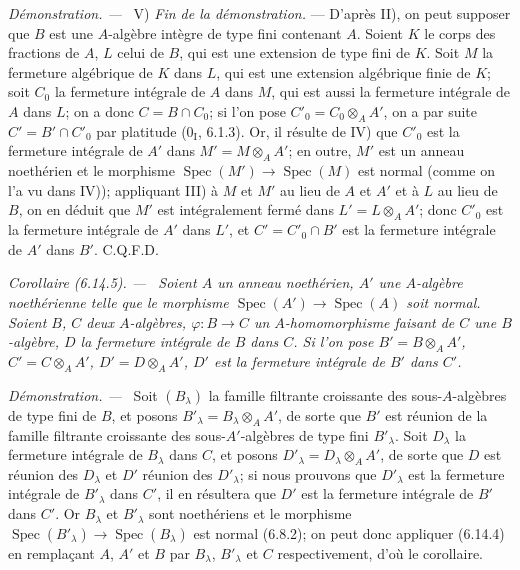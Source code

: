 \documentclass[10pt,oneside]{book}
\newcommand{\oldpage}[2][]{%
  \setcounter{footnote}{0}%
  \marginpar{\scriptsize\textbf{#1}~|~#2}\ignorespaces}
\newenvironment{corollary}[1][]{%
  \par\medskip\noindent\itshape Corollaire (#1). ---\ }{\par}
\newenvironment{proof}{%
  \par\medskip\noindent\textit{Démonstration. ---\ }}{\par}
\begin{document}
\begin{proof}
\oldpage[IV-2]{176}
V) \emph{Fin de la démonstration.} --- D'après II), on peut supposer que
$B$ est une $A$-algèbre intègre de type fini contenant $A$. Soient $K$ le
corps des fractions de $A$, $L$ celui de $B$, qui est une extension de type
fini de $K$. Soit $M$ la fermeture algébrique de $K$ dans $L$, qui est une
extension algébrique finie de $K$; soit $C_0$ la fermeture intégrale de $A$
dans $M$, qui est aussi la fermeture intégrale de $A$ dans $L$; on a donc
$C=B\cap C_0$; si l'on pose $C'_0=C_0\otimes_A A'$, on a par suite
$C'=B'\cap C'_0$ par platitude (0$_{\mathrm I}$, 6.1.3). Or, il résulte de
IV) que $C'_0$ est la fermeture intégrale de $A'$ dans
$M'=M\otimes_A A'$; en outre, $M'$ est un anneau noethérien et le morphisme
$\operatorname{Spec}(M')\to\operatorname{Spec}(M)$ est normal (comme on
l'a vu dans IV)); appliquant III) à $M$ et $M'$ au lieu de $A$ et $A'$ et
à $L$ au lieu de $B$, on en déduit que $M'$ est intégralement fermé dans
$L'=L\otimes_A A'$; donc $C'_0$ est la fermeture intégrale de $A'$ dans
$L'$, et $C'=C'_0\cap B'$ est la fermeture intégrale de $A'$ dans $B'$.
C.Q.F.D.
\end{proof}

\begin{corollary}[6.14.5]
\label{IV.2.s6.14.5-fr}
Soient $A$ un anneau noethérien, $A'$ une $A$-algèbre noethérienne telle
que le morphisme $\operatorname{Spec}(A')\to\operatorname{Spec}(A)$ soit
normal. Soient $B$, $C$ deux $A$-algèbres,
$\varphi:B\to C$ un $A$-homomorphisme faisant de $C$ une $B$-algèbre, $D$
la fermeture intégrale de $B$ dans $C$. Si l'on pose
$B'=B\otimes_A A'$, $C'=C\otimes_A A'$, $D'=D\otimes_A A'$, $D'$ est la
fermeture intégrale de $B'$ dans $C'$.
\end{corollary}

\begin{proof}
Soit $(B_\lambda)$ la famille filtrante croissante des sous-$A$-algèbres
de type fini de $B$, et posons $B'_\lambda=B_\lambda\otimes_A A'$, de
sorte que $B'$ est réunion de la famille filtrante croissante des
sous-$A'$-algèbres de type fini $B'_\lambda$. Soit $D_\lambda$ la
fermeture intégrale de $B_\lambda$ dans $C$, et posons
$D'_\lambda=D_\lambda\otimes_A A'$, de sorte que $D$ est réunion des
$D_\lambda$ et $D'$ réunion des $D'_\lambda$; si nous prouvons que
$D'_\lambda$ est la fermeture intégrale de $B'_\lambda$ dans $C'$, il en
résultera que $D'$ est la fermeture intégrale de $B'$ dans $C'$. Or
$B_\lambda$ et $B'_\lambda$ sont noethériens et le morphisme
$\operatorname{Spec}(B'_\lambda)\to\operatorname{Spec}(B_\lambda)$ est
normal (6.8.2); on peut donc appliquer (6.14.4) en remplaçant $A$, $A'$ et
$B$ par $B_\lambda$, $B'_\lambda$ et $C$ respectivement, d'où le
corollaire.
\end{proof}
\end{document}
